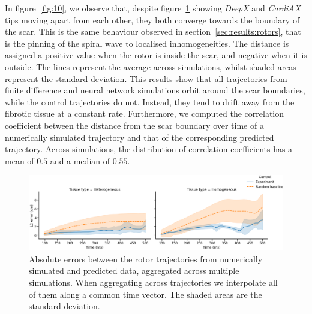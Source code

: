 \documentclass[utf8]{frontiersSCNS} %
\begin{document}
In figure~\ref{fig:10}, we observe that, despite figure~\ref{fig:9} showing \textit{DeepX} and \textit{CardiAX} tips moving apart from each other, they both converge towards the boundary of the scar.
This is the same behaviour observed in section~\ref{sec:results:rotors}, that is the pinning of the spiral wave to localised inhomogeneities.
The distance is assigned a positive value when the rotor is inside the scar, and negative when it is outside.
The lines represent the average across simulations, whilst shaded areas represent the standard deviation. %
This results show that all trajectories from finite difference and neural network simulations orbit around the scar boundaries, while the control trajectories do not. Instead, they tend to drift away from the fibrotic tissue at a constant rate.
Furthermore, we computed the correlation coefficient between the distance from the scar boundary over time of a numerically simulated trajectory and that of the corresponding predicted trajectory. Across simulations, the distribution of correlation coefficients has a mean of $0.5$ and a median of $0.55$.

\begin{figure}[!htp]
\centering
\includegraphics[width=\textwidth]{Figure-9.png}
\caption{Absolute errors between the rotor trajectories from numerically simulated and predicted data, aggregated across multiple simulations. When aggregating across trajectories we interpolate all of them along a common time vector. The shaded areas are the standard deviation. %
}
\label{fig:9}
\end{figure}
\end{document}
